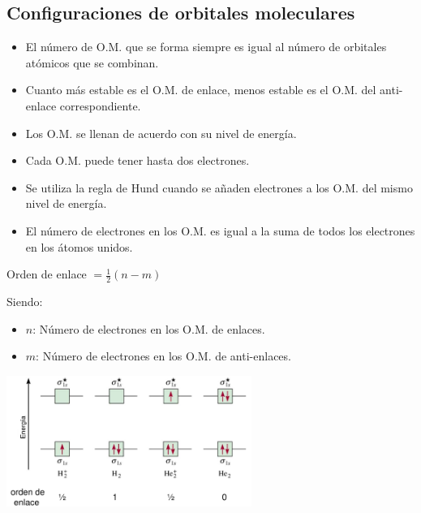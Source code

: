     \subsection{Configuraciones de orbitales moleculares}
        \begin{itemize} 
            \item El número de O.M. que se forma siempre es igual al número de orbitales atómicos que se combinan.
            \item Cuanto más estable es el O.M. de enlace, menos estable es el O.M. del anti-enlace correspondiente.
            \item Los O.M. se llenan de acuerdo con su nivel de energía.
            \item Cada O.M. puede tener hasta dos electrones.
            \item Se utiliza la regla de Hund cuando se añaden electrones a los O.M. del mismo nivel de energía.
            \item El número de electrones en los O.M. es igual a la suma de todos los electrones en los átomos unidos.
        \end{itemize}
        \begin{center} Orden de enlace $= \frac{1}{2} (n - m)$ \end{center}
        Siendo:
        \begin{itemize}
            \item $n$: Número de electrones en los O.M. de enlaces.
            \item $m$: Número de electrones en los O.M. de anti-enlaces.
        \end{itemize}
        \begin{center} \includegraphics[width=8cm]{./imagenes/ordenDeEnlaces.png} \end{center}
